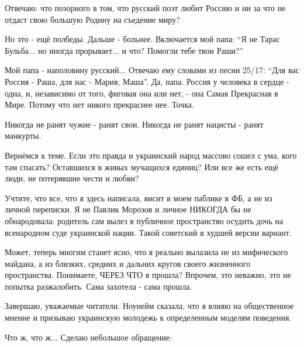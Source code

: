 Отвечаю: что позорного в том, что русский поэт любит Россию и ни за что не
отдаст свою большую Родину на съедение миру? 

Но это - ещё полбеды. Дальше - больнее. Включается мой папа: \enquote{Я не Тарас
Бульба... но иногда прорывает... и что? Помогли тебе твои Раши?}

Мой папа - наполовину русский... Отвечаю ему словами из песни 25/17:
\enquote{Для вас Россия - Раша, для нас - Мария, Маша}. Да, папа. Россия у
человека в сердце - одна, и, независимо от того, фиговая она или нет, - она
Самая Прекрасная в Мире. Потому что нет никого прекраснее нее. Точка.

Никогда не ранят чужие - ранят свои. Никогда не ранят нацисты - ранят манкурты. 

Вернёмся к теме. Если это правда и украинский народ массово сошел с ума, кого
там спасать? Оставшихся в живых мучащихся единиц? Или все же есть ещё люди, не
потерявшие чести и любви? 

Учтите, что все, что я здесь написала, висит в моем паблике в ФБ, а не из
личной переписки. Я не Павлик Морозов и личное НИКОГДА бы не обнародовала:
родитель сам вылез в публичное пространство осудить дочь на всенародном суде
украинской нации. Такой советский в худшей версии вариант. 

Может, теперь многим станет ясно, что я реально вылазила  не из мифического
майдана, а из близких, средних и дальних кругов своего жизненного пространства.
Понимаете, ЧЕРЕЗ ЧТО я прошла? Впрочем, это неважно, это не попытка
разжалобить. Сама захотела - сама прошла.

Завершаю, уважаемые читатели. Ноунейм сказала, что я влияю на общественное
мнение и призываю украинскую молодежь к определенным моделям поведения. 

Что ж, что ж... Сделаю небольшое обращение:

